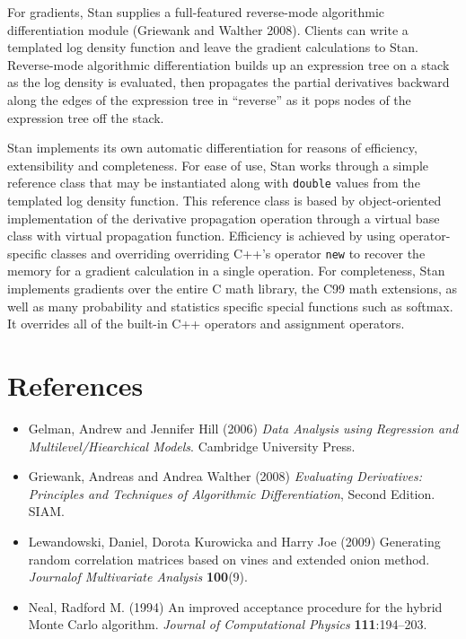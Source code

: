 \documentclass[twoside,11pt]{article}
\begin{document}
For gradients, Stan supplies a full-featured reverse-mode algorithmic
differentiation module (Griewank and Walther 2008).  Clients can write
a templated log density function and leave the gradient calculations
to Stan.  Reverse-mode algorithmic differentiation builds up an
expression tree on a stack as the log density is evaluated, then
propagates the partial derivatives backward along the edges of the
expression tree in ``reverse'' as it pops nodes of the expression tree
off the stack. 

Stan implements its own automatic differentiation for reasons of
efficiency, extensibility and completeness. For ease of use, Stan 
works through a simple reference class that may be instantiated
along with {\tt double} values from the templated log density
function.    This reference class is based by object-oriented
implementation of the derivative propagation operation through
a virtual base class with virtual propagation function.  Efficiency
is achieved by using operator-specific classes and overriding
overriding C++'s operator {\tt new} to recover the memory for a
gradient calculation in a single operation.  For completeness, Stan
implements gradients over the entire C math library, the C99
math extensions, as well as many probability and statistics specific
special functions such as softmax.  It overrides all of the built-in
C++ operators and assignment operators.  



\section*{References}

\begin{itemize}
\item
Gelman, Andrew and Jennifer Hill (2006)
{\it Data Analysis using Regression and Multilevel/Hiearchical
Models}. Cambridge University Press.
%
\item
Griewank, Andreas and Andrea Walther (2008) {\it Evaluating
Derivatives: Principles and Techniques of Algorithmic
Differentiation}, Second Edition. SIAM.
%
\item Lewandowski, Daniel, Dorota Kurowicka and Harry Joe (2009)
Generating random correlation matrices based on vines and extended
onion method. {\it Journalof Multivariate Analysis} {\bf 100}(9).
%
\item Neal, Radford M. (1994) An improved acceptance procedure for the
hybrid Monte Carlo algorithm.  {\it Journal of Computational Physics}
{\bf 111}:194--203.
\end{itemize}
\end{document}
